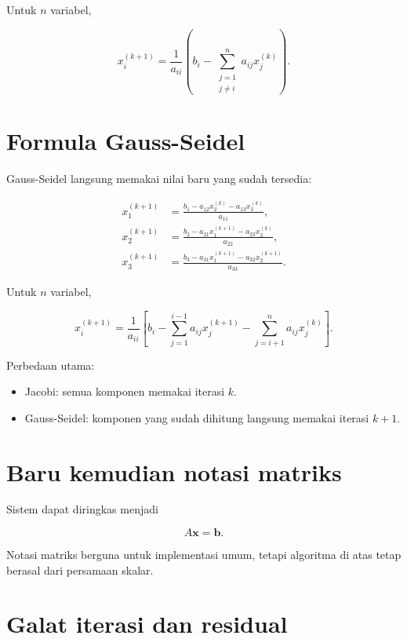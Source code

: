 Untuk $n$ variabel,

\begin{equation}
x_i^{(k+1)}
=
\frac{1}{a_{ii}}
\left(
b_i-\sum_{\substack{j=1\\j\ne i}}^n a_{ij}x_j^{(k)}
\right).
\end{equation}

\section{Formula Gauss-Seidel}

Gauss-Seidel langsung memakai nilai baru yang sudah tersedia:

\begin{align}
x_1^{(k+1)}
&=
\frac{b_1-a_{12}x_2^{(k)}-a_{13}x_3^{(k)}}{a_{11}},\\
x_2^{(k+1)}
&=
\frac{b_2-a_{21}x_1^{(k+1)}-a_{23}x_3^{(k)}}{a_{22}},\\
x_3^{(k+1)}
&=
\frac{b_3-a_{31}x_1^{(k+1)}-a_{32}x_2^{(k+1)}}{a_{33}}.
\end{align}

Untuk $n$ variabel,

\begin{equation}
x_i^{(k+1)}
=
\frac{1}{a_{ii}}
\left[
b_i
-\sum_{j=1}^{i-1}a_{ij}x_j^{(k+1)}
-\sum_{j=i+1}^{n}a_{ij}x_j^{(k)}
\right].
\end{equation}

Perbedaan utama:

\begin{itemize}
\item Jacobi: semua komponen memakai iterasi $k$.
\item Gauss-Seidel: komponen yang sudah dihitung langsung memakai iterasi $k+1$.
\end{itemize}

\section{Baru kemudian notasi matriks}

Sistem dapat diringkas menjadi

\begin{equation}
A\mathbf{x}=\mathbf{b}.
\end{equation}

Notasi matriks berguna untuk implementasi umum, tetapi algoritma di atas tetap berasal dari persamaan skalar.

\section{Galat iterasi dan residual}

